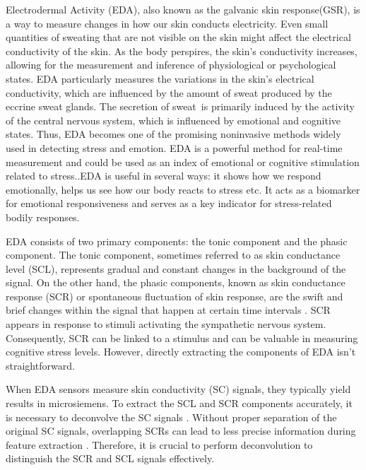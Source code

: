 Electrodermal Activity (EDA), also known as the galvanic skin response(GSR), is a way to measure changes in how our skin conducts electricity. Even small quantities of sweating that are not visible on the skin might affect the electrical conductivity of the skin. As the body perspires, the skin's conductivity increases, allowing for the measurement and inference of physiological or psychological states.
EDA  particularly measures the variations in the skin's electrical conductivity, which are influenced by the amount of sweat produced by the eccrine sweat glands. The secretion of sweat is primarily induced by the activity of the central nervous system, which is influenced by emotional and cognitive states\parencite{eda23}. Thus, EDA becomes one of the promising noninvasive methods widely used in detecting stress and emotion. EDA is a powerful method for real-time measurement and could be used as an index of emotional or cognitive stimulation related to stress.\parencite{gellman2020behavioral}.EDA is useful in several ways: it shows how we respond emotionally, helps us see how our body reacts to stress etc. It acts as a biomarker for emotional responsiveness and serves as a key indicator for stress-related bodily responses. 

\gls{EDA} consists of two primary components: the tonic component and the phasic component. The tonic component, sometimes referred to as skin conductance level (SCL), represents gradual and constant changes in the background of the signal. On the other hand, the phasic components, known as skin conductance response (SCR) or spontaneous fluctuation of skin response, are the swift and brief changes within the signal that happen at certain time intervals \parencite*{hernando2017feature}. SCR appears in response to stimuli activating the sympathetic nervous system. Consequently, SCR can be linked to a stimulus and can be valuable in measuring cognitive stress levels. However, directly extracting the components of EDA isn't straightforward.

When EDA sensors measure skin conductivity (SC) signals, they typically yield results in microsiemens. To extract the SCL and SCR components accurately, it is necessary to deconvolve the SC signals \parencite[postnote]{alexander2005separating}. Without proper separation of the original SC signals, overlapping SCRs can lead to less precise information during feature extraction . Therefore, it is crucial to perform deconvolution to distinguish the SCR and SCL signals effectively.

